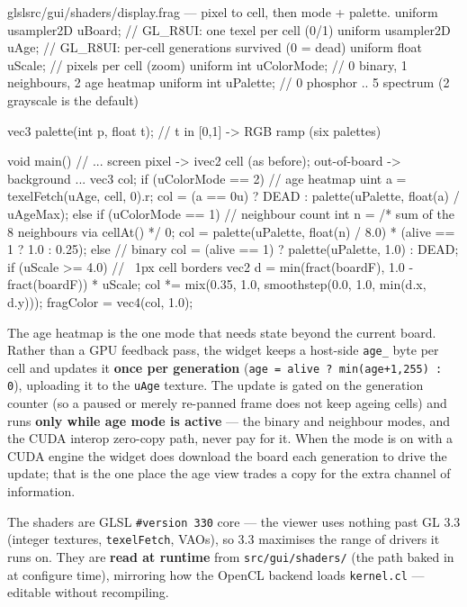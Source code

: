 \documentclass[
	english,
	letterpaper, oneside
]{article}
\begin{document}
\begin{sourcecode}{glsl}{src/gui/shaders/display.frag --- pixel to cell, then mode + palette.}
uniform usampler2D uBoard;     // GL_R8UI: one texel per cell (0/1)
uniform usampler2D uAge;       // GL_R8UI: per-cell generations survived (0 = dead)
uniform float uScale;          // pixels per cell (zoom)
uniform int   uColorMode;      // 0 binary, 1 neighbours, 2 age heatmap
uniform int   uPalette;        // 0 phosphor .. 5 spectrum (2 grayscale is the default)

vec3 palette(int p, float t);  // t in [0,1] -> RGB ramp (six palettes)

void main() {
    // ... screen pixel -> ivec2 cell (as before); out-of-board -> background ...
    vec3 col;
    if (uColorMode == 2) {                                     // age heatmap
        uint a = texelFetch(uAge, cell, 0).r;
        col = (a == 0u) ? DEAD : palette(uPalette, float(a) / uAgeMax);
    } else if (uColorMode == 1) {                              // neighbour count
        int n = /* sum of the 8 neighbours via cellAt() */ 0;
        col = palette(uPalette, float(n) / 8.0) * (alive == 1 ? 1.0 : 0.25);
    } else {                                                   // binary
        col = (alive == 1) ? palette(uPalette, 1.0) : DEAD;
    }
    if (uScale >= 4.0) {                                        // ~1px cell borders
        vec2 d = min(fract(boardF), 1.0 - fract(boardF)) * uScale;
        col *= mix(0.35, 1.0, smoothstep(0.0, 1.0, min(d.x, d.y)));
    }
    fragColor = vec4(col, 1.0);
}
\end{sourcecode}

The age heatmap is the one mode that needs state beyond the current board. Rather than
a GPU feedback pass, the widget keeps a host-side \texttt{age\_} byte per cell and
updates it \textbf{once per generation} (\texttt{age = alive ? min(age+1,255) : 0}),
uploading it to the \texttt{uAge} texture. The update is gated on the generation
counter (so a paused or merely re-panned frame does not keep ageing cells) and runs
\textbf{only while age mode is active} --- the binary and neighbour modes, and the
CUDA interop zero-copy path, never pay for it. When the mode is on with a CUDA engine
the widget does download the board each generation to drive the update; that is the
one place the age view trades a copy for the extra channel of information.

The shaders are GLSL \texttt{\#version 330} core --- the viewer uses nothing past
GL 3.3 (integer textures, \texttt{texelFetch}, VAOs), so 3.3 maximises the range
of drivers it runs on. They are \textbf{read at runtime} from
\texttt{src/gui/shaders/} (the path baked in at configure time), mirroring how the
OpenCL backend loads \texttt{kernel.cl} --- editable without recompiling.
\end{document}

